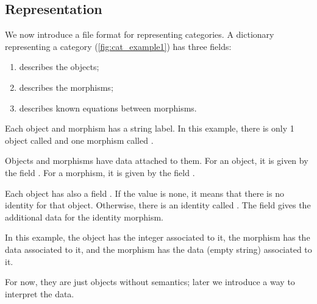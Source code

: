 \vfill
\begin{widepar}
\end{widepar}
\vfill

\clearpage

\subsection{Representation}

\begin{marginfigure}
\end{marginfigure}

We now introduce a file format for representing categories.
A dictionary representing a category (\cref{fig:cat_example1}) has three fields:
\begin{enumerate}
    \item {} describes the objects;
    \item {} describes the morphisms;
    \item {} describes known equations between morphisms.
\end{enumerate}
Each object and morphism has a string label.
In this example, there is only 1 object called 
and one morphism called .

Objects and morphisms have data attached to them.
For an object, it is given by the field .
For a morphism, it is given by the field .

Each object has also a field .
If the value is none, it means that there is no identity for that object.
Otherwise, there is an identity called . The field  gives the additional data for the identity morphism.

In this example, the object  has the integer  associated to it, the morphism  has the data  associated to it, and the morphism  has the data  (empty string) associated to it.

For now, they are just objects without semantics; later we introduce a way to interpret the data.

